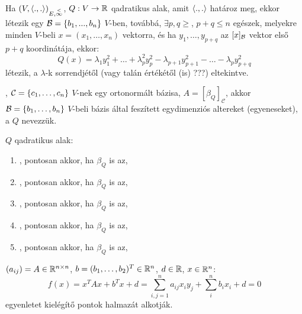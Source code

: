 	\begin{tet}
		Ha $(V,\langle.,.\rangle)_{E,\overset{<}{\infty}}$, $Q:V\to \mathbb{R}$ qadratikus alak, amit $\langle.,.\rangle$ határoz meg,
		ekkor létezik egy $\mathcal{B}=\{b_1,...,b_n\}$ $V$-ben, továbbá, $\exists p,q\ge$,
		$p+q\le n$ egészek, melyekre minden $V$-beli $x=(x_1,\ldots,x_n)$
		vektorra, és ha $y_1,\ldots,y_{p+q}$ az $[x]_{\mathcal{B}}$ vektor első $p+q$
		koordinátája, ekkor:
		\begin{equation*}
			Q(x)=\lambda_1y_1^2+\ldots+\lambda_p^2y_p^2-\lambda_{p+1}y_{p+1}^2-\ldots-
			\lambda_py_{p+q}^2
		\end{equation*}
		létezik, a $\lambda$-k sorrendjétől (vagy talán értékétől (is) ???) eltekintve.
	\end{tet}
	\begin{ff}
		, $\mathcal{C}=\{c_1,\dots,c_n\}$ $V$-nek egy ortonormált
		bázisa, $A=[\beta_Q]_\mathcal{C}$, akkor $\mathcal{B}=\{b_1,\ldots,b_n\}$
		$V$-beli bázis által feszített egydimenziós altereket (egyeneseket), a
		$Q$  nevezzük.
	\end{ff}
	\begin{ff}
		$Q$ qadratikus alak:
		\begin{enumerate}
			\item {}, pontosan akkor, ha $\beta_Q$ is az,
			\item {}, pontosan akkor, ha $\beta_Q$ is az,
			\item {}, pontosan akkor, ha $\beta_Q$ is az,
			\item {}, pontosan akkor, ha $\beta_Q$ is az,
			\item {}, pontosan akkor, ha $\beta_Q$ is az,
		\end{enumerate}
	\end{ff}
	\begin{ff}
		$(a_{ij})=A\in\mathbb{R}^{n\times n}$, $b=(b_1,\ldots,b_2)^T\in\mathbb{R}^n$, $d\in\mathbb{R}$, $x\in\mathbb{R}^n$:
		\begin{equation*}
			f(x)=x^TAx+b^Tx+d=\sum_{i,j=1}^na_{ij}x_iy_j+\sum_i^nb_ix_i+d=0
		\end{equation*}
		egyenletet kielégítő pontok  halmazát alkotják.
	\end{ff}

